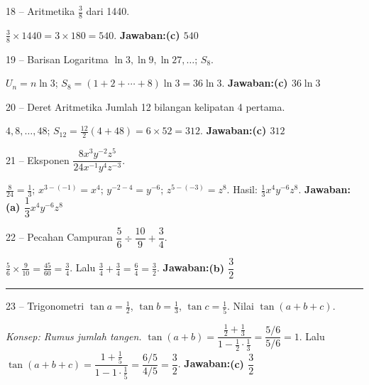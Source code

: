 \documentclass[11pt]{article}
\newcommand{\jawaban}[1]{\textbf{Jawaban:}\enspace\colorbox{gold!30}{\textbf{#1}}}
\newcommand{\konsep}[1]{\textit{Konsep: #1.}}
\begin{document}
\begin{soal}{18 -- Aritmetika}
$\frac38$ dari 1440.
\end{soal}
\begin{pembox}
$\frac38\times1440=3\times180=540$.
\jawaban{(c) $540$}
\end{pembox}

\begin{soal}{19 -- Barisan Logaritma}
$\ln3,\ln9,\ln27,\ldots$; $S_8$.
\end{soal}
\begin{pembox}
$U_n=n\ln3$; $S_8=(1+2+\cdots+8)\ln3=36\ln3$.
\jawaban{(c) $36\ln3$}
\end{pembox}

\begin{soal}{20 -- Deret Aritmetika}
Jumlah 12 bilangan kelipatan 4 pertama.
\end{soal}
\begin{pembox}
$4,8,\ldots,48$; $S_{12}=\frac{12}{2}(4+48)=6\times52=312$.
\jawaban{(c) $312$}
\end{pembox}

\begin{soal}{21 -- Eksponen}
$\dfrac{8x^3y^{-2}z^5}{24x^{-1}y^4z^{-3}}$.
\end{soal}
\begin{pembox}
$\frac{8}{24}=\frac13$; $x^{3-(-1)}=x^4$; $y^{-2-4}=y^{-6}$; $z^{5-(-3)}=z^8$. Hasil: $\frac13x^4y^{-6}z^8$.
\jawaban{(a) $\dfrac13x^4y^{-6}z^8$}
\end{pembox}

\begin{soal}{22 -- Pecahan Campuran}
$\dfrac56\div\dfrac{10}{9}+\dfrac34$.
\end{soal}
\begin{pembox}
$\frac56\times\frac{9}{10}=\frac{45}{60}=\frac34$. Lalu $\frac34+\frac34=\frac{6}{4}=\frac32$.
\jawaban{(b) $\dfrac32$}
\end{pembox}

\smallskip\hrule\medskip

\begin{soal}{23 -- Trigonometri}
$\tan a=\frac12$, $\tan b=\frac13$, $\tan c=\frac15$. Nilai $\tan(a+b+c)$.
\end{soal}
\begin{pembox}
\konsep{Rumus jumlah tangen}
$\tan(a+b)=\dfrac{\frac12+\frac13}{1-\frac12\cdot\frac13}=\dfrac{5/6}{5/6}=1$. Lalu $\tan(a+b+c)=\dfrac{1+\frac15}{1-1\cdot\frac15}=\dfrac{6/5}{4/5}=\dfrac32$.
\jawaban{(c) $\dfrac32$}
\end{pembox}
\end{document}

